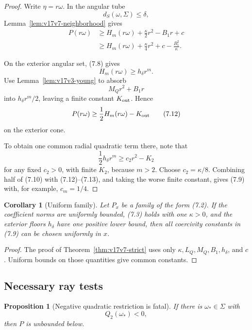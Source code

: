 \documentclass[11pt]{article}
\newtheorem{proposition}[theorem]{Proposition}
\newtheorem{corollary}[theorem]{Corollary}
\theoremstyle{remark}
\begin{document}
\begin{proof}
Write \(\eta=r\omega\).  In the angular tube
\[
 d_S(\omega,\Sigma)\leq\delta,
\]
Lemma~\ref{lem:v17v7-neighborhood} gives
\[
\begin{split}
 P(r\omega)
 &\geq
 H_m(r\omega)+\frac{\kappa}{2}r^2-B_1r+c\\
 &\geq
 H_m(r\omega)+\frac{\kappa}{4}r^2
 +c-\frac{B_1^2}{\kappa}.                          \tag{7.10}
\end{split}
\]

On the exterior angular set, (7.8) gives
\[
 H_m(r\omega)\geq h_\delta r^m.                    \tag{7.11}
\]
Use Lemma~\ref{lem:v17v3-young} to absorb
\[
 M_Qr^2+B_1r
\]
into \(h_\delta r^m/2\), leaving a finite constant
\(K_{\rm out}\).  Hence
\[
 P(r\omega)\geq\frac12H_m(r\omega)-K_{\rm out}
                                                               \tag{7.12}
\]
on the exterior cone.

To obtain one common radial quadratic term there, note that
\[
 \frac12h_\delta r^m
 \geq c_2r^2-K_2                                  \tag{7.13}
\]
for any fixed \(c_2>0\), with finite \(K_2\), because \(m>2\).
Choose \(c_2=\kappa/8\).  Combining half of (7.10) with
(7.12)--(7.13), and taking the worse finite constant, gives (7.9)
with, for example, \(c_m=1/4\).
\end{proof}

\begin{corollary}[Uniform family]
\label{cor:v17v7-family}
Let \(P_x\) be a family of the form (7.2).  If the coefficient norms
are uniformly bounded, (7.3) holds with one
\(\kappa>0\), and the exterior floors \(h_\delta\) have one positive
lower bound, then all coercivity constants in (7.9) can be chosen
uniformly in \(x\).
\end{corollary}

\begin{proof}
The proof of Theorem~\ref{thm:v17v7-strict} uses only
\(\kappa,L_Q,M_Q,B_1,h_\delta\), and \(c\).  Uniform bounds on those
quantities give common constants.
\end{proof}

\subsection{Necessary ray tests}

\begin{proposition}[Negative quadratic restriction is fatal]
\label{prop:v17v7-negative}
If there is \(\omega_*\in\Sigma\) with
\[
 Q_2(\omega_*)<0,                                  \tag{7.14}
\]
then \(P\) is unbounded below.
\end{proposition}
\end{document}
